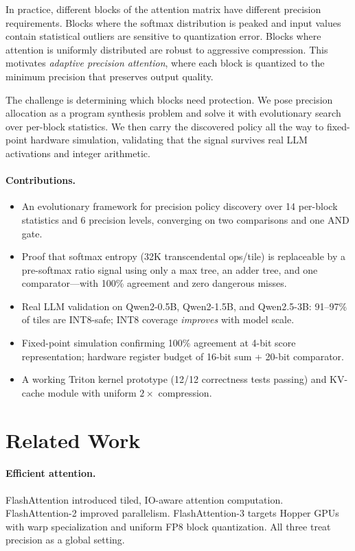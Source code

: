 \documentclass[10pt,twocolumn]{article}
\begin{document}
In practice, different blocks of the attention matrix have different
precision requirements. Blocks where the softmax distribution is peaked
and input values contain statistical outliers are sensitive to
quantization error. Blocks where attention is uniformly distributed are
robust to aggressive compression. This motivates \emph{adaptive precision
attention}, where each block is quantized to the minimum precision that
preserves output quality.

The challenge is determining which blocks need protection. We pose
precision allocation as a program synthesis problem and solve it with
evolutionary search over per-block statistics. We then carry the
discovered policy all the way to fixed-point hardware simulation,
validating that the signal survives real LLM activations and integer
arithmetic.

\paragraph{Contributions.}
\begin{itemize}
  \item An evolutionary framework for precision policy discovery over 14
  per-block statistics and 6 precision levels, converging on two
  comparisons and one AND gate.
  \item Proof that softmax entropy (32K transcendental ops/tile) is
  replaceable by a pre-softmax ratio signal using only a max tree, an
  adder tree, and one comparator---with 100\% agreement and zero
  dangerous misses.
  \item Real LLM validation on Qwen2-0.5B, Qwen2-1.5B, and Qwen2.5-3B:
  91--97\% of tiles are INT8-safe; INT8 coverage \emph{improves} with
  model scale.
  \item Fixed-point simulation confirming 100\% agreement at 4-bit score
  representation; hardware register budget of 16-bit sum + 20-bit
  comparator.
  \item A working Triton kernel prototype (12/12 correctness tests
  passing) and KV-cache module with uniform $2\times$ compression.
\end{itemize}

\section{Related Work}

\paragraph{Efficient attention.}
FlashAttention \citep{dao2022flashattention} introduced tiled, IO-aware
attention computation. FlashAttention-2 \citep{dao2023flashattention2}
improved parallelism. FlashAttention-3 \citep{shah2024flashattention3}
targets Hopper GPUs with warp specialization and uniform FP8 block
quantization. All three treat precision as a global setting.
\end{document}
